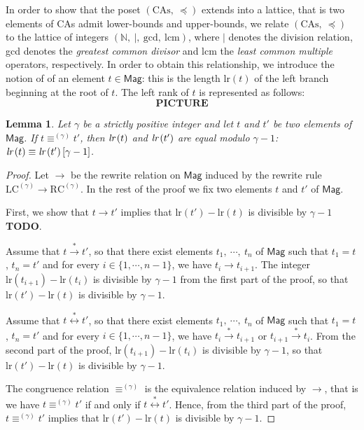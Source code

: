 \documentclass[10pt,reqno]{amsart}
\numberwithin{equation}{subsection}
\newtheorem{Lemma}[Theorem]{Lemma}
\newcommand{\N}{\mathbb{N}}
\newcommand{\Mag}{\mathsf{Mag}}
\newcommand{\LC}[1]{\text{LC}^{(#1)}}
\newcommand{\RC}[1]{\text{RC}^{(#1)}}
\DeclareMathOperator{\Congr}{\equiv}
\DeclareMathOperator{\Rew}{\to}
\newcommand{\CongrCAs}[1]{\Congr^{(#1)}}
\begin{document}
In order to show that the poset $\left(\text{CAs},\ \preceq\right)$ extends into a lattice,
that is two elements of CAs admit lower-bounds and upper-bounds, we relate
$\left(\text{CAs},\ \preceq\right)$ to the lattice of integers
$\left(\N,\ \mid,\ \text{gcd},\ \text{lcm}\right)$, where $\mid$ denotes the division
relation, gcd denotes the \emph{greatest common divisor} and lcm the \emph{least common multiple}
operators, respectively. In order to obtain this relationship, we introduce the notion of
 of an element $t\in\Mag$: this is the length $\text{lr}\left(t\right)$ of
the left branch beginning at the root of $t$. The left rank of $t$ is represented as follows:
\[\textbf{PICTURE}\]

\begin{Lemma}\label{lem:left_rank_and_CongrCAs}
  Let $\gamma$ be a strictly positive integer and let $t$ and $t'$ be two elements of $\Mag$. If
  $t\CongrCAs{\gamma}t'$, then $\emph{lr}\left(t\right)$ and $\emph{lr}\left(t'\right)$ are equal modulo $\gamma-1$: $\emph{lr}\left(t\right)\equiv\emph{lr}\left(t'\right) [\gamma-1]$.
\end{Lemma}

\begin{proof}
  Let $\Rew$ be the rewrite relation on $\Mag$ induced by the rewrite rule
  $\LC{\gamma}\Rew\RC{\gamma}$. In the rest of the proof we fix two elements $t$ and $t'$ of $\Mag$.

  First, we show that $t\Rew t'$ implies that $\text{lr}\left(t'\right)-\text{lr}\left(t\right)$
  is divisible by $\gamma-1$ \textbf{TODO}.

  Assume that $t\overset{*}{\Rew}t'$, so that there exist elements $t_1,\ \cdots,\ t_n$
  of $\Mag$ such that $t_1=t$, $t_n=t'$ and for every $i\in\{1,\cdots,n-1\}$, we have
  $t_i\Rew t_{i+1}$. The integer $\text{lr}\left(t_{i+1}\right)-\text{lr}\left(t_i\right)$
  is divisible by $\gamma-1$ from the first part of the proof, so that
  $\text{lr}\left(t'\right)-\text{lr}\left(t\right)$ is divisible by $\gamma-1$.

  Assume that $t\overset{*}{\leftrightarrow}t'$, so that there exist elements $t_1,\ \cdots,\ t_n$
  of $\Mag$ such that $t_1=t$, $t_n=t'$ and for every $i\in\{1,\cdots,n-1\}$, we have
  $t_i\overset{*}{\Rew}t_{i+1}$ or $t_{i+1}\overset{*}{\Rew}t_i$. From the second part of the proof,
  $\text{lr}\left(t_{i+1}\right)-\text{lr}\left(t_i\right)$ is divisible by $\gamma-1$, so that
  $\text{lr}\left(t'\right)-\text{lr}\left(t\right)$ is divisible by $\gamma-1$.
  
  The congruence relation $\CongrCAs{\gamma}$ is the equivalence relation induced by $\Rew$, that
  is we have $t\CongrCAs{\gamma}t'$ if and only if $t\overset{*}{\leftrightarrow}t'$. Hence, from the
  third part of the proof, $t\CongrCAs{\gamma}t'$ implies that
  $\text{lr}\left(t'\right)-\text{lr}\left(t\right)$ is divisible by $\gamma-1$.
  \end{proof}
\end{document}
